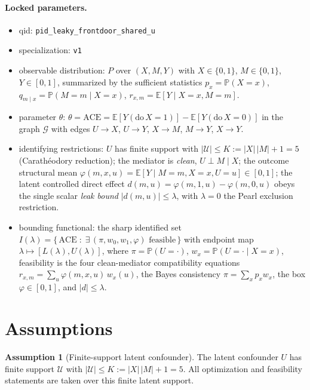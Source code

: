 \documentclass[11pt]{article}
\newcommand{\E}{\mathbb{E}}
\renewcommand{\Pr}{\mathbb{P}}
\theoremstyle{definition}
\newtheorem{assumption}{Assumption}
\theoremstyle{plain}
\theoremstyle{remark}
\begin{document}
\paragraph{Locked parameters.}
\begin{itemize}
  \item qid: \texttt{pid\_leaky\_frontdoor\_shared\_u}
  \item specialization: \texttt{v1}
  \item observable distribution: \(P\) over \((X,M,Y)\) with \(X\in\{0,1\}\),
        \(M\in\{0,1\}\), \(Y\in[0,1]\), summarized by the sufficient statistics
        \(p_x=\Pr(X=x)\), \(q_{m\mid x}=\Pr(M=m\mid X=x)\),
        \(r_{x,m}=\E[Y\mid X=x,M=m]\).
  \item parameter \(\theta\): \(\theta=\mathrm{ACE}=\E[Y(\mathrm{do}\,X=1)]-\E[Y(\mathrm{do}\,X=0)]\)
        in the graph \(\mathcal G\) with edges \(U\to X\), \(U\to Y\), \(X\to M\),
        \(M\to Y\), \(X\to Y\).
  \item identifying restrictions: \(U\) has finite support with
        \(|\mathcal U|\le K:=|X|\,|M|+1=5\) (Carath\'eodory reduction); the mediator is
        \emph{clean}, \(U\perp M\mid X\); the outcome structural mean
        \(\varphi(m,x,u)=\E[Y\mid M=m,X=x,U=u]\in[0,1]\); the latent controlled direct
        effect \(d(m,u)=\varphi(m,1,u)-\varphi(m,0,u)\) obeys the single scalar
        \emph{leak bound} \(|d(m,u)|\le\lambda\), with \(\lambda=0\) the Pearl exclusion restriction.
  \item bounding functional: the sharp identified set
        \(I(\lambda)=\{\,\mathrm{ACE}\;:\;\exists\,(\pi,w_0,w_1,\varphi)\text{ feasible}\,\}\)
        with endpoint map \(\lambda\mapsto[L(\lambda),U(\lambda)]\), where
        \(\pi=\Pr(U=\cdot)\), \(w_x=\Pr(U=\cdot\mid X=x)\), feasibility is the four
        clean-mediator compatibility equations
        \(r_{x,m}=\sum_u\varphi(m,x,u)\,w_x(u)\), the Bayes consistency
        \(\pi=\sum_x p_x w_x\), the box \(\varphi\in[0,1]\), and \(|d|\le\lambda\).
\end{itemize}

\section{Assumptions}
\begin{assumption}[Finite-support latent confounder]\label{ass:finite}
The latent confounder \(U\) has finite support \(\mathcal U\) with
\(|\mathcal U|\le K:=|X|\,|M|+1=5\). All optimization and feasibility statements are
taken over this finite latent support.
\end{assumption}
\end{document}
